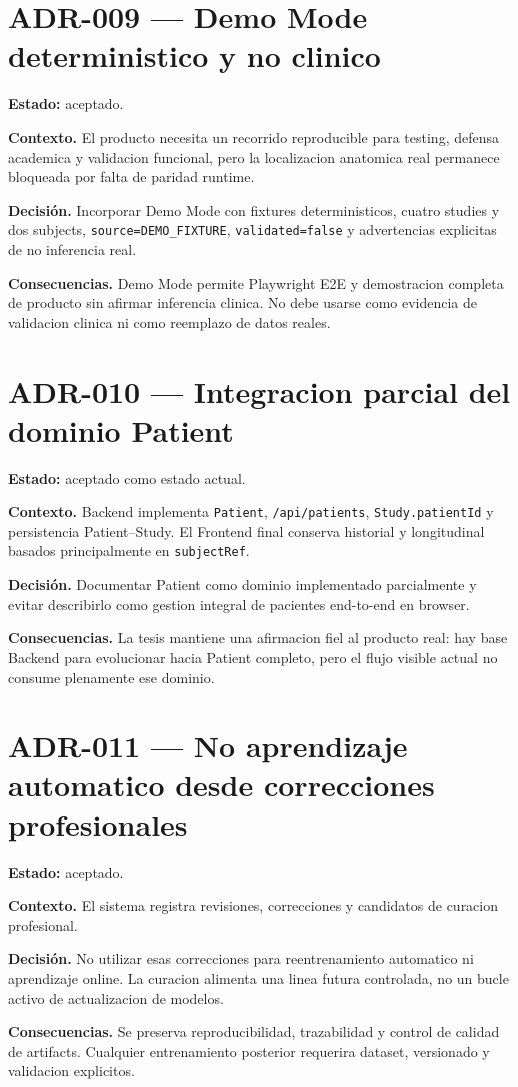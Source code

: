 \section*{ADR-009 --- Demo Mode deterministico y no clinico}

\textbf{Estado:} aceptado.

\textbf{Contexto.} El producto necesita un recorrido reproducible para testing, defensa academica y validacion funcional, pero la localizacion anatomica real permanece bloqueada por falta de paridad runtime.

\textbf{Decisión.} Incorporar Demo Mode con fixtures deterministicos, cuatro studies y dos subjects, \texttt{source=DEMO\_FIXTURE}, \texttt{validated=false} y advertencias explicitas de no inferencia real.

\textbf{Consecuencias.} Demo Mode permite Playwright E2E y demostracion completa de producto sin afirmar inferencia clinica. No debe usarse como evidencia de validacion clinica ni como reemplazo de datos reales.

\section*{ADR-010 --- Integracion parcial del dominio Patient}

\textbf{Estado:} aceptado como estado actual.

\textbf{Contexto.} Backend implementa \texttt{Patient}, \texttt{/api/patients}, \texttt{Study.patientId} y persistencia Patient--Study. El Frontend final conserva historial y longitudinal basados principalmente en \texttt{subjectRef}.

\textbf{Decisión.} Documentar Patient como dominio implementado parcialmente y evitar describirlo como gestion integral de pacientes end-to-end en browser.

\textbf{Consecuencias.} La tesis mantiene una afirmacion fiel al producto real: hay base Backend para evolucionar hacia Patient completo, pero el flujo visible actual no consume plenamente ese dominio.

\section*{ADR-011 --- No aprendizaje automatico desde correcciones profesionales}

\textbf{Estado:} aceptado.

\textbf{Contexto.} El sistema registra revisiones, correcciones y candidatos de curacion profesional.

\textbf{Decisión.} No utilizar esas correcciones para reentrenamiento automatico ni aprendizaje online. La curacion alimenta una linea futura controlada, no un bucle activo de actualizacion de modelos.

\textbf{Consecuencias.} Se preserva reproducibilidad, trazabilidad y control de calidad de artifacts. Cualquier entrenamiento posterior requerira dataset, versionado y validacion explicitos.
